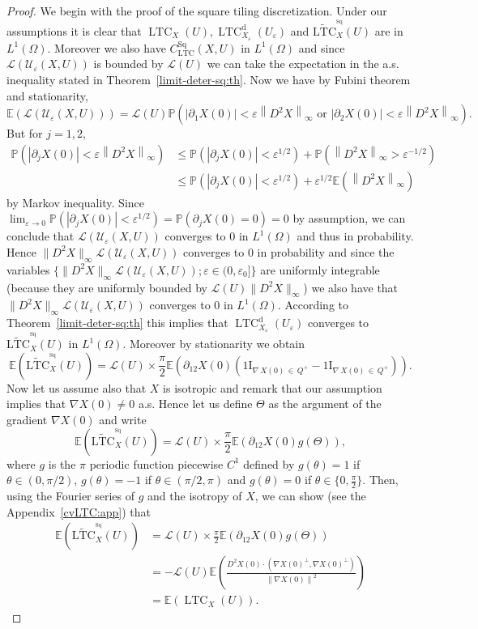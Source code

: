 \documentclass[AHL,Unicode,longabstracts,published]{cedram}
\newcommand{\bbP}{\mathbb{P}}
\newcommand{\E}{\mathbb{E}}
\newcommand{\ind}{{1\!\!\mathrm{I}}}
\newcommand{\eps}{\varepsilon}
\DeclareMathOperator{\LTC}{LTC}
\newcommand{\dd}{\mathrm{d}}
\DeclareMathOperator{\Sq}{Sq}
\newcommand{\tLTC}{\widetilde{\mathrm{LTC}}}
\newcommand{\calL}{\mathcal{L}}
\newcommand{\calU}{\mathcal{U}}
\begin{document}
\begin{proof}
We begin with the proof of the square tiling
discretization. Under our assumptions it is clear that $\LTC_X(U),
\LTC^{\dd}_{X_\eps}(U_\eps)$ and $\tLTC^{^{\Sq}}_{X}(U)$ are in $L^1(\Omega)$. Moreover we also have $C_{\LTC}^{\Sq}(X,U)$ in $L^1(\Omega)$ and since ${\calL}(\calU_{\eps}(X,U))$ is bounded by ${\calL}(U)$ we can take the expectation in the a.s. inequality stated in Theorem~\ref{limit-deter-sq:th}. Now we have by Fubini theorem and stationarity,
\[
\E\left({\calL}(\calU_{\eps}(X,U))\right)={\calL}(U)\bbP\left(\left|\partial_1 X(0)\right|<\eps \left\|D^2 X\right\|_\infty \text{ or } \left|\partial_2 X(0)\right|<\eps \left\|D^2 X\right\|_\infty \right).
\]
But for $j=1,2$,
\begin{align*}
\bbP\left(\left|\partial_j X(0)\right|<\eps \left\|D^2 X\right\|_\infty\right)&\le \bbP\left(\left|\partial_j X(0)\right|<\eps^{1/2}\right)+ \bbP\left(\left\|D^2 X\right\|_\infty>\eps^{-1/2}\right)\\
&\le \bbP\left(\left|\partial_j X(0)\right|<\eps^{1/2}\right)+\eps^{1/2}\E\left(\left\|D^2 X\right\|_\infty\right)
\end{align*}
by Markov inequality. Since $\lim_{\eps\rightarrow 0}\bbP(|\partial_j X(0)|<\eps^{1/2})=\bbP(\partial_j X(0)=0)=0$ by assumption, we can conclude that ${\calL}(\calU_{\eps}(X,U))$ converges to $0$ in $L^1(\Omega)$ and thus in probability. Hence $\|D^2 X\|_\infty {\calL}(\calU_{\eps}(X,U))$ converges to $0$ in probability and since the variables $\{\|D^2 X\|_\infty {\calL}(\calU_{\eps}(X,U)); \eps\in (0,\eps_0]\}$ are uniformly integrable (because they are uniformly bounded by ${\calL}(U)\|D^2 X\|_\infty$) we also have that $\|D^2 X\|_\infty {\calL}(\calU_{\eps}(X,U))$ converges to $0$ in $L^1(\Omega)$. According to Theorem~\ref{limit-deter-sq:th} this implies that $\LTC^\dd_{X_\eps}(U_\eps)$ converges to $\tLTC^{^{\Sq}}_{X}(U)$ in $L^1(\Omega)$. Moreover by stationarity we obtain
\[
\E\left(\tLTC^{^{\Sq}}_{X}(U)\right)={\calL}(U)\times \frac{\pi}{2}\E\left(\partial_{12}X(0)\left(\ind_{\nabla\,X(0)\,\in\,Q^+}-\ind_{\nabla\, X(0)\,\in\,Q^+}\right)\right).
\]
Now let us assume also that $X$ is isotropic and remark that our assumption implies that $\nabla X(0)\neq 0$ a.s. Hence let us define $\Theta$ as the argument of the gradient $\nabla X(0)$ and write
\[
\E\left(\tLTC^{^{\Sq}}_{X}(U)\right)={\calL}(U)\times \frac{\pi}{2}\E\left(\partial_{12}X(0)g(\Theta)\right),
\]
where $g$ is the $\pi$ periodic function piecewise $C^1$ defined by $g(\theta)=1$ if $\theta\in (0,\pi/2)$, $g(\theta)=-1$ if $\theta\in (\pi/2,\pi)$ and $g(\theta)=0$ if $\theta\in\{0,\frac{\pi}{2}\}$. Then, using the Fourier series of $g$ and the isotropy of $X$, we can show (see the Appendix~\ref{cvLTC:app}) that
\begin{align*}
\E\left(\tLTC^{^{\Sq}}_{X}(U)\right)&=\calL(U)\times
\frac{\pi}{2}\E\left(\partial_{12}X(0)g(\Theta)\right) \\
&=- {\calL}(U) \E\left(\frac{D^2X(0)\cdot \left(\nabla X(0)^\perp,\nabla X(0)^\perp\right)}{\left\|\nabla X(0)\right\|^2}\right)\\
&=\E\left(\LTC_X(U)\right).
\end{align*}


\end{proof}
\end{document}
